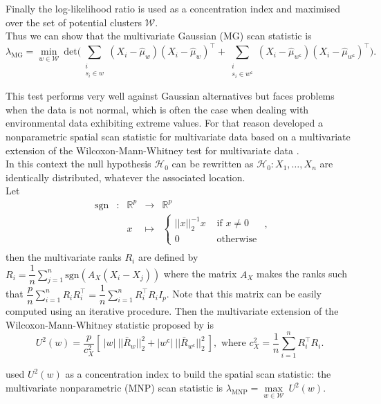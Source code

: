 \noindent Finally the log-likelihood ratio is used as a concentration index and maximised over the set of potential clusters $\mathcal{W}$. \\ Thus we can show that the multivariate Gaussian (MG) scan statistic is $$\lambda_{\text{MG}} = \underset{w \in \mathcal{W}}{\min} \ \text{det}\Big(\sum_{\substack{i\\ s_i \in w}} \left(X_i - \widehat{\mu}_w \right) \left(X_i - \widehat{\mu}_w \right)^\top + \sum_{\substack{i \\ s_i \in w^\mathsf{c}}} \left(X_i - \widehat{\mu}_{w^\mathsf{c}} \right) \left(X_i - \widehat{\mu}_{w^\mathsf{c}} \right)^\top \Big).$$

\noindent This test performs very
well against Gaussian alternatives but faces problems when the data is
not normal, which is often the case when dealing with environmental data
exhibiting extreme values. For that reason \citet{nonparam_multi} developed a nonparametric spatial scan statistic for multivariate data based on a multivariate extension of the Wilcoxon-Mann-Whitney test for multivariate data \citep{oja}. \\
In this context the null hypothesis $\mathcal{H}_0$ can be rewritten as $\mathcal{H}_0: X_1, \dots, X_n$ are identically distributed, whatever the associated location. \\
Let $$\begin{array}{ccccl}
\text{sgn} & : & \mathbb{R}^p & \to & \mathbb{R}^p \\
 & & x & \mapsto & \left\{
\begin{array}{cl}
  ||x||_2^{-1} x & \text{ if } x \neq 0 \\
  0 & \text{ otherwise}
\end{array}
\right. \\
\end{array},$$ then the multivariate ranks $R_i$ are defined by $\displaystyle{R_i = \dfrac{1}{n} \sum_{j=1}^{n} \text{sgn}(A_X(X_i - X_j))}$ where the matrix $A_X$ makes the ranks such that $\displaystyle{\dfrac{p}{n}\sum_{i=1}^{n} R_i R_i^\top = \dfrac{1}{n} \sum_{i=1}^{n} R_i^\top R_i I_p}$. Note that this matrix can be easily computed using an iterative procedure.
Then the multivariate
extension of the Wilcoxon-Mann-Whitney statistic proposed by \citet{oja} is $$U^2(w) = \dfrac{p}{c^2_X} \left[\ |w| \ ||\bar{R}_w||_2^2 + |w^\mathsf{c}| \ ||\bar{R}_{w^\mathsf{c}}||_2^2 \ \right], \text{ where } \displaystyle{c^2_X = \dfrac{1}{n}\sum_{i=1}^n R_i^\top R_i}. $$

\noindent \citet{nonparam_multi} used $U^2(w)$ as a concentration index to build the spatial scan statistic: the multivariate nonparametric (MNP) scan
statistic is $\lambda_{\text{MNP}} = \underset{w \in \mathcal{W}}{\max} \ U^2(w)$.

